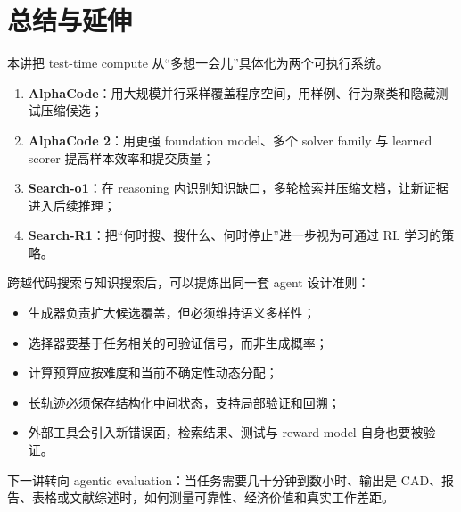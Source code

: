 \documentclass[a4paper]{article}
\begin{document}
\section{总结与延伸}

本讲把 test-time compute 从“多想一会儿”具体化为两个可执行系统。

\begin{enumerate}
    \item \textbf{AlphaCode}：用大规模并行采样覆盖程序空间，用样例、行为聚类和隐藏测试压缩候选；
    \item \textbf{AlphaCode 2}：用更强 foundation model、多个 solver family 与 learned scorer 提高样本效率和提交质量；
    \item \textbf{Search-o1}：在 reasoning 内识别知识缺口，多轮检索并压缩文档，让新证据进入后续推理；
    \item \textbf{Search-R1}：把“何时搜、搜什么、何时停止”进一步视为可通过 RL 学习的策略。
\end{enumerate}

跨越代码搜索与知识搜索后，可以提炼出同一套 agent 设计准则：

\begin{itemize}
    \item 生成器负责扩大候选覆盖，但必须维持语义多样性；
    \item 选择器要基于任务相关的可验证信号，而非生成概率；
    \item 计算预算应按难度和当前不确定性动态分配；
    \item 长轨迹必须保存结构化中间状态，支持局部验证和回溯；
    \item 外部工具会引入新错误面，检索结果、测试与 reward model 自身也要被验证。
\end{itemize}

下一讲转向 agentic evaluation：当任务需要几十分钟到数小时、输出是 CAD、报告、表格或文献综述时，如何测量可靠性、经济价值和真实工作差距。
\end{document}
